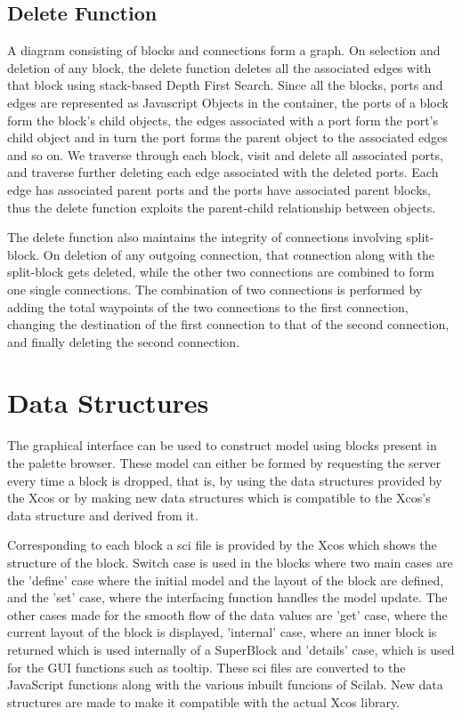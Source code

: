 \documentclass[conference]{IEEEtran}
\begin{document}
\subsection{Delete Function}

A diagram consisting of blocks and connections form a graph. On selection and deletion of any block, the delete function deletes all the associated edges with that block using stack-based Depth First Search. Since all the blocks, ports and edges are represented as Javascript Objects in the container, the ports of a block form the block's child objects, the edges associated with a port form the port's child object and in turn the port forms the parent object to the associated edges and so on. We traverse through each block, visit and delete all associated ports, and traverse further deleting each edge associated with the deleted ports. Each edge has associated parent ports and the ports have associated parent blocks, thus the delete function exploits the parent-child relationship between objects.

The delete function also maintains the integrity of connections involving split-block.
On deletion of any outgoing connection, that connection along with the split-block gets deleted, while the other two connections are combined to form one single connections. The combination of two connections is performed by adding the total waypoints of the two connections to the first connection, changing the destination of the first connection to that of the second connection, and finally deleting the second connection.

\section{Data Structures}
The graphical interface can be used to construct model using blocks present in the palette browser. These model can either be formed by requesting the server every time a block is dropped, that is, by using the data structures provided by the Xcos or by making new data structures which is compatible to the Xcos's data structure and derived from it. 

Corresponding to each block a sci file is provided by the Xcos which shows the structure of the block. Switch case is used in the blocks where two main cases are the 'define' case where the initial model and the layout of the block are defined, and the 'set' case, where the interfacing function handles the model update. The other cases made for the smooth flow of the data values are 'get' case, where the current layout of the block is displayed, 'internal' case, where an inner block is returned which is used internally of a SuperBlock and 'details' case, which is used for the GUI functions such as tooltip. These sci files are converted to the JavaScript functions along with the various inbuilt funcions of Scilab. New data structures are made to make it compatible with the actual Xcos library.
\end{document}
